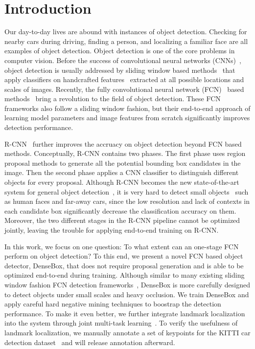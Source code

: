 \section{Introduction}
Our day-to-day lives are abound with instances of object detection. Checking for nearby cars during driving, finding a person, and localizing a familiar face are all examples of object detection. Object detection is one of the core problems in computer vision. Before the success of convolutional neural networks (CNNs)~\cite{krizhevsky2012imagenet}, object detection is usually addressed by sliding window based methods~\cite{felzenszwalb2010object, viola2004robust} that apply classifiers on handcrafted features~\cite{dalal2005histograms, lowe2004distinctive, cinbis2013segmentation} extracted at all possible locations and scales of images. Recently, the fully convolutional neural network (FCN)~\cite{long2015fully} based methods~\cite{sermanet2013overfeat, erhan2014scalable, YOLO} bring a revolution to the field of object detection. These FCN frameworks also follow a sliding window fashion, but their end-to-end approach of learning model parameters and image features from scratch significantly improves detection performance. 

R-CNN~\cite{girshick2014rich, girshick2015fast} further improves the accruacy on object detection beyond FCN based methods. Conceptually, R-CNN contains two phases. The first phase uses region proposal methods to generate all the potential bounding box candidates in the image. Then the second phase applies a CNN classifier to distinguish different objects for every proposal. Although R-CNN becomes the new state-of-the-art system for general object detection~\cite{everingham2010pascal, russakovsky2014imagenet}, it is very hard to detect small objects~\cite{pepik2015holding} such as human faces and far-away cars, since the low resolution and lack of contexts in each candidate box significantly decrease the classification accuracy on them. Moreover, the two different stages in the R-CNN pipeline cannot be optimized jointly, leaving the trouble for applying end-to-end training on R-CNN. 

In this work, we focus on one question: To what extent can an one-stage FCN perform on object detection? To this end, we present a novel FCN based object detector, DenseBox, that does not require proposal generation and is able to be optimized end-to-end during training. Although similar to many existing sliding window fashion FCN detection frameworks~\cite{sermanet2013overfeat, erhan2014scalable, YOLO}, DenseBox is more carefully designed to detect objects under small scales and heavy occlusion. We train DenseBox and apply careful hard negative mining techniques to boostrap the detection performance. To make it even better, we further integrate landmark localization into the system through joint multi-task learning~\cite{bengio2013representation}. To verify the usefulness of landmark localization, we manually annotate a set of keypoints for the KITTI car detection dataset~\cite{Geiger2012CVPR} and will release annotation afterward. 

